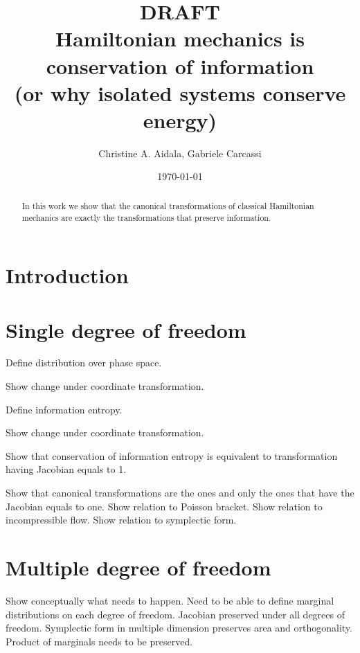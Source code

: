 \documentclass[aps,pra,10pt,twocolumn,floatfix,nofootinbib]{revtex4-1}
\begin{document}
\title{DRAFT \\ Hamiltonian mechanics is conservation of information \\ (or why isolated systems conserve energy)}
\author{Christine A. Aidala, Gabriele Carcassi}



\date{\today}

\begin{abstract}
In this work we show that the canonical transformations of classical Hamiltonian mechanics are exactly the transformations that preserve information.
\end{abstract}

\maketitle

\section{Introduction}

\section{Single degree of freedom}
Define distribution over phase space.

Show change under coordinate transformation.

Define information entropy.

Show change under coordinate transformation.

Show that conservation of information entropy is equivalent to transformation having Jacobian equals to 1.

Show that canonical transformations are the ones and only the ones that have the Jacobian equals to one. Show relation to Poisson bracket. Show relation to incompressible flow. Show relation to symplectic form.

\section{Multiple degree of freedom}

Show conceptually what needs to happen. Need to be able to define marginal distributions on each degree of freedom. Jacobian preserved under all degrees of freedom. Symplectic form in multiple dimension preserves area and orthogonality. Product of marginals needs to be preserved.
\end{document}
